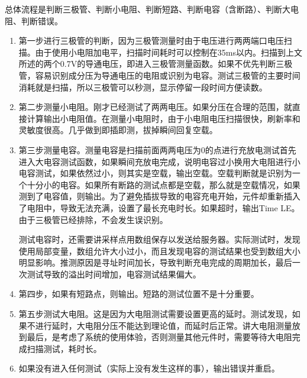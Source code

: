 \documentclass[a4paper]{article}
\begin{document}
		总体流程是判断三极管、判断小电阻、判断短路、判断电容（含断路）、判断大电阻、判断错误。
		\begin{enumerate}
		    \item 第一步进行三极管的判断，因为三极管测量时由于电压进行两两端口电压扫描。由于使用小电阻加电平，扫描时间耗时可以控制在35ms以内。扫描到上文所述的两个0.7V的导通电压，即进入三极管测量函数。如果不优先判断三极管，容易识别成分压为导通电压的电阻或识别为电容。测试三极管的主要时间消耗就是扫描，所以三极管可以秒测，显示停留一段时间方便读数。
		    \item 第二步测量小电阻。刚才已经测试了两两电压。如果分压在合理的范围，就直接计算输出小电阻值。在测量小电阻时，由于小电阻电压扫描很快，刷新率和灵敏度很高。几乎做到即插即测，拔掉瞬间回复空载。
		    \item 第三步测量电容。测量电容是扫描前面两两电压为0的点进行充放电测试首先进入大电容测试函数，如果瞬间充放电完成，说明电容过小换用大电阻进行小电容测试，如果依然过小，则其实是空载，输出空载。空载判断就是识别为一个十分小的电容。如果所有断路的测试点都是空载，那么就是空载情况，如果测到了电容值，则输出。为了避免插拔导致的电容充电开始，元件却重新插入了电阻中，导致无法充满，设置了最长充电时长。如果超时，输出Time LE。由于三极管已经排除，不会发生误识别。
		    
		    测试电容时，还需要讲采样点用数组保存以发送给服务器。实际测试时，发现使用局部变量，数组允许大小过小，而且发现电容的测试结果也受到数组大小明显影响。推测原因是寻址时间加长，导致判断充电完成的周期加长，最后一次测试导致的溢出时间增加，电容测试结果偏大。
		    \item 第四步，如果有短路点，则输出。短路的测试位置不是十分重要。
		    \item 第五步测试大电阻。这是因为大电阻测试需要设置更高的延时。测试发现，如果不进行延时，大电阻分压不能达到理论值，而延时后正常。讲大电阻测量放到最后，是考虑了系统的使用体验，否则测量其他元件时，需要等待大电阻完成扫描测试，耗时长。
		    \item 如果没有进入任何测试（实际上没有发生这样的事），输出错误并重启。
		\end{enumerate}
		
\end{document}
